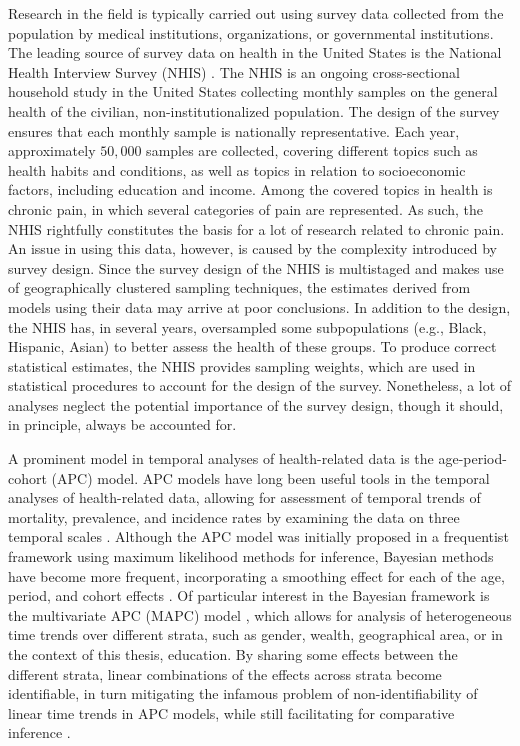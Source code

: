 Research in the field is typically carried out using survey data collected from the population by medical institutions, organizations, or governmental institutions. The leading source of survey data on health in the United States is the National Health Interview Survey (NHIS) \citep{NHIS-original}. The NHIS is an ongoing cross-sectional household study in the United States collecting monthly samples on the general health of the civilian, non-institutionalized population. The design of the survey ensures that each monthly sample is nationally representative. Each year, approximately $50,000$ samples are collected, covering different topics such as health habits and conditions, as well as topics in relation to socioeconomic factors, including education and income. Among the covered topics in health is chronic pain, in which several categories of pain are represented. As such, the NHIS rightfully constitutes the basis for a lot of research related to chronic pain. An issue in using this data, however, is caused by the complexity introduced by survey design. Since the survey design of the NHIS is multistaged and makes use of geographically clustered sampling techniques, the estimates derived from models using their data may arrive at poor conclusions. In addition to the design, the NHIS has, in several years, oversampled some subpopulations (e.g., Black, Hispanic, Asian) to better assess the health of these groups. To produce correct statistical estimates, the NHIS provides sampling weights, which are used in statistical procedures to account for the design of the survey. Nonetheless, a lot of analyses neglect the potential importance of the survey design, though it should, in principle, always be accounted for.

A prominent model in temporal analyses of health-related data is the age-period-cohort (APC) model. APC models have long been useful tools in the temporal analyses of health-related data, allowing for assessment of temporal trends of mortality, prevalence, and incidence rates by examining the data on three temporal scales \citep{APC-OLD, APC-OLD-2, APC-OLD-3}. Although the APC model was initially proposed in a frequentist framework using maximum likelihood methods for inference, Bayesian methods have become more frequent, incorporating a smoothing effect for each of the age, period, and cohort effects \citep{APC-Bayesian-Yang, APC-Bayesian-Held}. Of particular interest in the Bayesian framework is the multivariate APC (MAPC) model \citep{hansell2003copd, jacobsen2004women}, which allows for analysis of heterogeneous time trends over different strata, such as gender, wealth, geographical area, or in the context of this thesis, education. By sharing some effects between the different strata, linear combinations of the effects across strata become identifiable, in turn mitigating the infamous problem of non-identifiability of linear time trends in APC models, while still facilitating for comparative inference \citep{APC-Bayesian-Andrea}. 

